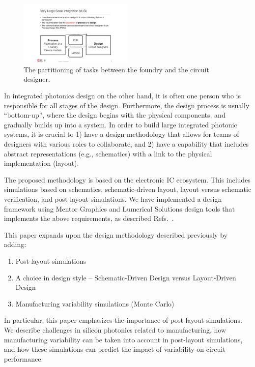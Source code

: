\documentclass[journal]{spie}
\begin{document}
\begin{figure}[tbp]
	\centering
	\includegraphics[width=0.5\textwidth]{../figs_paper/Process_Design.pdf}
    \caption[]{The partitioning of tasks between the foundry and the circuit designer.}
    \label{Process_Design}
\end{figure}



In integrated photonics design on the other hand, it is often one person who is responsible for all stages of the design.  Furthermore, the design process is usually ``bottom-up'', where the design begins with the physical components, and gradually builds up into a system.   In order to build large integrated photonic systems, it is crucial to 1) have a design methodology that allows for teams of designers with various roles to collaborate, and 2) have a capability that includes abstract representations (e.g., schematics) with a link to the physical implementation (layout).  

The proposed methodology is based on the electronic IC ecosystem.  This includes simulations based on schematics, schematic-driven layout, layout versus schematic verification, and post-layout simulations.   We have implemented a design framework using Mentor Graphics and Lumerical Solutions design tools that implements the above requirements, as described Refs.~.  

This paper expands upon the design methodology described previously by adding:
\begin{enumerate} 
\item Post-layout simulations
\item A choice in design style -- Schematic-Driven Design versus Layout-Driven Design
\item Manufacturing variability simulations (Monte Carlo)
\end{enumerate}
In particular, this paper emphasizes the importance of post-layout simulations.  We describe challenges in silicon photonics related to manufacturing, how manufacturing variability can be taken into account in post-layout simulations, and how these simulations can predict the impact of variability on circuit performance.
\end{document}
